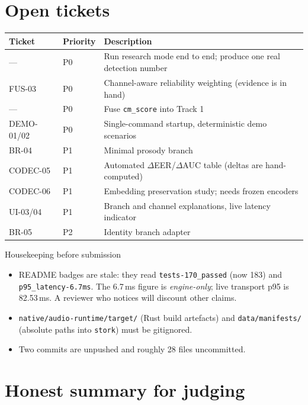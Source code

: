 \documentclass[11pt,a4paper]{article}
\newcommand{\code}[1]{\texttt{\small #1}}
\begin{document}
\section{Open tickets}

\begin{center}
\begin{tabular}{@{}llp{7.4cm}@{}}
\toprule
\textbf{Ticket} & \textbf{Priority} & \textbf{Description}\\
\midrule
--- & P0 & Run research mode end to end; produce one real detection number\\
FUS-03 & P0 & Channel-aware reliability weighting (evidence is in hand)\\
--- & P0 & Fuse \code{cm\_score} into Track 1\\
DEMO-01/02 & P0 & Single-command startup, deterministic demo scenarios\\
BR-04 & P1 & Minimal prosody branch\\
CODEC-05 & P1 & Automated $\Delta$EER/$\Delta$AUC table (deltas are hand-computed)\\
CODEC-06 & P1 & Embedding preservation study; needs frozen encoders\\
UI-03/04 & P1 & Branch and channel explanations, live latency indicator\\
BR-05 & P2 & Identity branch adapter\\
\bottomrule
\end{tabular}
\end{center}

\begin{todobox}{Housekeeping before submission}
\begin{itemize}[nosep,leftmargin=1.4em]
\item README badges are stale: they read \code{tests-170\_passed} (now 183) and
\code{p95\_latency-6.7ms}. The 6.7\,ms figure is \emph{engine-only}; live transport
p95 is 82.53\,ms. A reviewer who notices will discount other claims.
\item \code{native/audio-runtime/target/} (Rust build artefacts) and
\code{data/manifests/} (absolute paths into \code{stork}) must be gitignored.
\item Two commits are unpushed and roughly 28 files uncommitted.
\end{itemize}
\end{todobox}

\section{Honest summary for judging}
\end{document}
